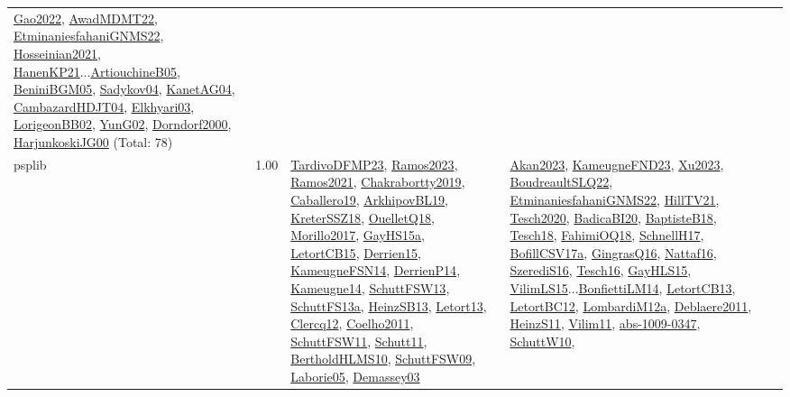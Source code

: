 {\begin{longtable}{p{3cm}r>{\raggedright\arraybackslash}p{6cm}>{\raggedright\arraybackslash}p{6cm}>{\raggedright\arraybackslash}p{8cm}}
\hyperref[detail:Gao2022]{Gao2022}, \hyperref[detail:AwadMDMT22]{AwadMDMT22}, \hyperref[detail:EtminaniesfahaniGNMS22]{EtminaniesfahaniGNMS22}, \hyperref[detail:Hosseinian2021]{Hosseinian2021}, \hyperref[detail:HanenKP21]{HanenKP21}...\hyperref[detail:ArtiouchineB05]{ArtiouchineB05}, \hyperref[detail:BeniniBGM05]{BeniniBGM05}, \hyperref[detail:Sadykov04]{Sadykov04}, \hyperref[detail:KanetAG04]{KanetAG04}, \hyperref[detail:CambazardHDJT04]{CambazardHDJT04}, \hyperref[detail:Elkhyari03]{Elkhyari03}, \hyperref[detail:LorigeonBB02]{LorigeonBB02}, \hyperref[detail:YunG02]{YunG02}, \hyperref[detail:Dorndorf2000]{Dorndorf2000}, \hyperref[detail:HarjunkoskiJG00]{HarjunkoskiJG00} (Total: 78)\\
\index{psplib}\index{Classification!psplib}psplib &  1.00 & \hyperref[detail:TardivoDFMP23]{TardivoDFMP23}, \hyperref[detail:Ramos2023]{Ramos2023}, \hyperref[detail:Ramos2021]{Ramos2021}, \hyperref[detail:Chakrabortty2019]{Chakrabortty2019}, \hyperref[detail:Caballero19]{Caballero19}, \hyperref[detail:ArkhipovBL19]{ArkhipovBL19}, \hyperref[detail:KreterSSZ18]{KreterSSZ18}, \hyperref[detail:OuelletQ18]{OuelletQ18}, \hyperref[detail:Morillo2017]{Morillo2017}, \hyperref[detail:GayHS15a]{GayHS15a}, \hyperref[detail:LetortCB15]{LetortCB15}, \hyperref[detail:Derrien15]{Derrien15}, \hyperref[detail:KameugneFSN14]{KameugneFSN14}, \hyperref[detail:DerrienP14]{DerrienP14}, \hyperref[detail:Kameugne14]{Kameugne14}, \hyperref[detail:SchuttFSW13]{SchuttFSW13}, \hyperref[detail:SchuttFS13a]{SchuttFS13a}, \hyperref[detail:HeinzSB13]{HeinzSB13}, \hyperref[detail:Letort13]{Letort13}, \hyperref[detail:Clercq12]{Clercq12}, \hyperref[detail:Coelho2011]{Coelho2011}, \hyperref[detail:SchuttFSW11]{SchuttFSW11}, \hyperref[detail:Schutt11]{Schutt11}, \hyperref[detail:BertholdHLMS10]{BertholdHLMS10}, \hyperref[detail:SchuttFSW09]{SchuttFSW09}, \hyperref[detail:Laborie05]{Laborie05}, \hyperref[detail:Demassey03]{Demassey03} & \hyperref[detail:Akan2023]{Akan2023}, \hyperref[detail:KameugneFND23]{KameugneFND23}, \hyperref[detail:Xu2023]{Xu2023}, \hyperref[detail:BoudreaultSLQ22]{BoudreaultSLQ22}, \hyperref[detail:EtminaniesfahaniGNMS22]{EtminaniesfahaniGNMS22}, \hyperref[detail:HillTV21]{HillTV21}, \hyperref[detail:Tesch2020]{Tesch2020}, \hyperref[detail:BadicaBI20]{BadicaBI20}, \hyperref[detail:BaptisteB18]{BaptisteB18}, \hyperref[detail:Tesch18]{Tesch18}, \hyperref[detail:FahimiOQ18]{FahimiOQ18}, \hyperref[detail:SchnellH17]{SchnellH17}, \hyperref[detail:BofillCSV17a]{BofillCSV17a}, \hyperref[detail:GingrasQ16]{GingrasQ16}, \hyperref[detail:Nattaf16]{Nattaf16}, \hyperref[detail:SzerediS16]{SzerediS16}, \hyperref[detail:Tesch16]{Tesch16}, \hyperref[detail:GayHLS15]{GayHLS15}, \hyperref[detail:VilimLS15]{VilimLS15}...\hyperref[detail:BonfiettiLM14]{BonfiettiLM14}, \hyperref[detail:LetortCB13]{LetortCB13}, \hyperref[detail:LetortBC12]{LetortBC12}, \hyperref[detail:LombardiM12a]{LombardiM12a}, \hyperref[detail:Deblaere2011]{Deblaere2011}, \hyperref[detail:HeinzS11]{HeinzS11}, \hyperref[detail:Vilim11]{Vilim11}, \hyperref[detail:abs-1009-0347]{abs-1009-0347}, \hyperref[detail:SchuttW10]{SchuttW10}, 
\end{longtable}}
